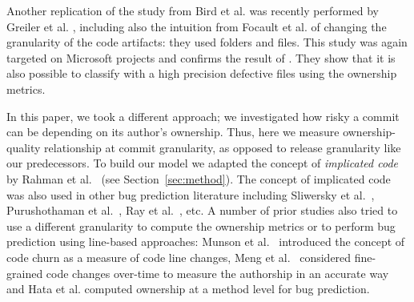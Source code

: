 


Another replication of the study from Bird et al. was recently performed by Greiler et al. \cite{Greiler:replication}, including also the intuition from Focault et al. of changing the granularity of the code artifacts: they used folders and files. This study was again targeted on Microsoft projects and confirms the result of \cite{bird:original}. They show that it is also possible to classify with a high precision defective files using the ownership metrics.

In this paper, we took a different approach; we investigated how risky a commit can be depending on its author's ownership. Thus, here we measure ownership-quality relationship at commit granularity, as opposed to release granularity like our predecessors. To build our model we adapted the concept of {\em implicated code} by Rahman et al.~\cite{Rahman:blame} (see Section~\ref{sec:method}). The concept of implicated code was also used in other bug prediction literature including Sliwersky et al.~\cite{sliwerski2005changes}, Purushothaman et al.~\cite{purushothaman2004towards}, Ray et al.~\cite{ray2015naturalness}, etc.
A number of prior studies also tried to use a different granularity to compute the ownership metrics or to perform bug prediction using line-based approaches: Munson et al.~\cite{munson1998code} introduced the concept of code churn as a measure of code line changes, Meng et al.~\cite{meng2013mining} considered fine-grained code changes over-time to measure the authorship in an accurate way and Hata et al. \cite{hata2012bug} computed ownership at a method level for bug prediction.

